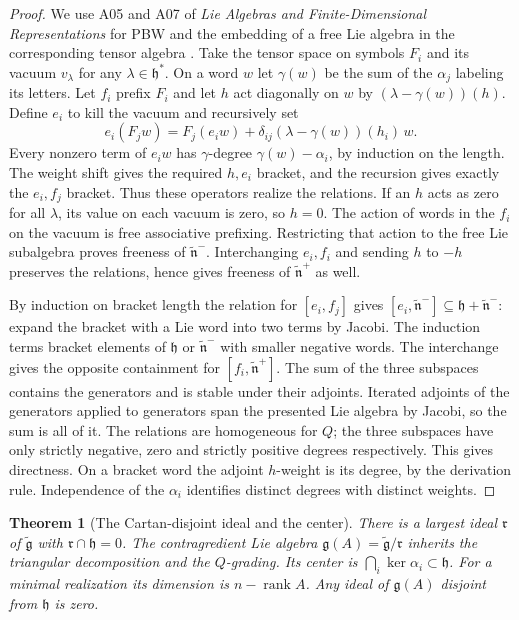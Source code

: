 \documentclass[11pt,oneside,openany]{book}
\newtheorem{theorem}{Theorem}[chapter]
\theoremstyle{definition}
\theoremstyle{remark}
\begin{document}
\begin{proof}
We use A05 and A07 of \emph{Lie Algebras and Finite-Dimensional
Representations} for PBW and the embedding of a free Lie algebra
in the corresponding tensor algebra \cite[PDF pp.~8--9]{mg-lie}.
Take the tensor space on symbols \(F_i\) and its vacuum \(v_\lambda\)
for any \(\lambda\in\mathfrak h^*\). On a word \(w\) let
\(\gamma(w)\) be the sum of the \(\alpha_j\) labeling its letters.
Let \(f_i\) prefix \(F_i\) and let \(h\) act diagonally on \(w\) by
\((\lambda-\gamma(w))(h)\). Define \(e_i\) to kill the vacuum and
recursively set
\[
 e_i(F_j w)=F_j(e_i w)
               +\delta_{ij}(\lambda-\gamma(w))(h_i)\,w.
\]
Every nonzero term of \(e_i w\) has \(\gamma\)-degree
\(\gamma(w)-\alpha_i\), by induction on the length. The weight
shift gives the required \(h,e_i\) bracket, and the recursion
gives exactly the \(e_i,f_j\) bracket. Thus these operators realize
the relations. If an \(h\) acts as zero for all \(\lambda\), its value
on each vacuum is zero, so \(h=0\). The action of words in the
\(f_i\) on the vacuum is free associative prefixing. Restricting
that action to the free Lie subalgebra proves freeness of
\(\widetilde{\mathfrak n}^-\). Interchanging \(e_i,f_i\) and sending
\(h\) to \(-h\) preserves the relations, hence gives freeness of
\(\widetilde{\mathfrak n}^+\) as well.

By induction on bracket length the relation for \([e_i,f_j]\)
gives \([e_i,\widetilde{\mathfrak n}^-]\subseteq
\mathfrak h+\widetilde{\mathfrak n}^-\): expand the bracket with
a Lie word into two terms by Jacobi. The induction terms
bracket elements of \(\mathfrak h\) or \(\widetilde{\mathfrak n}^-\)
with smaller negative words. The interchange gives the opposite
containment for \([f_i,\widetilde{\mathfrak n}^+]\).
The sum of the three subspaces contains the generators and is stable
under their adjoints. Iterated adjoints of the generators applied to
generators span the presented Lie algebra by Jacobi, so the sum
is all of it. The relations are homogeneous for \(Q\); the three
subspaces have only strictly negative, zero and strictly positive
degrees respectively. This gives directness. On a bracket word
the adjoint \(h\)-weight is its degree, by the derivation rule.
Independence of the \(\alpha_i\) identifies distinct degrees
with distinct weights.
\end{proof}

\begin{theorem}[The Cartan-disjoint ideal and the center]
\label{res:KM04}
There is a largest ideal \(\mathfrak r\) of
\(\widetilde{\mathfrak g}\) with \(\mathfrak r\cap\mathfrak h=0\).
The contragredient Lie algebra
\(\mathfrak g(A)=\widetilde{\mathfrak g}/\mathfrak r\) inherits
the triangular decomposition and the \(Q\)-grading.
Its center is \(\bigcap_i\ker\alpha_i\subset\mathfrak h\).
For a minimal realization its dimension is
\(n-\operatorname{rank}A\). Any ideal of \(\mathfrak g(A)\)
disjoint from \(\mathfrak h\) is zero.
\end{theorem}
\end{document}
